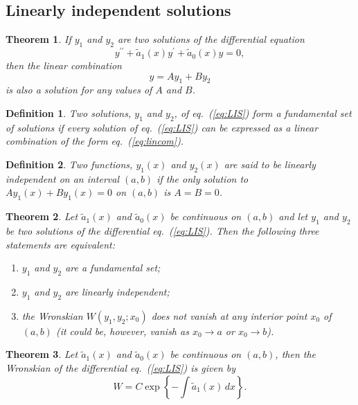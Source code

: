 \documentclass{article}
\newtheorem{theorem}{Theorem}
\newtheorem{definition}{Definition}
\begin{document}
\subsection{Linearly independent solutions}
\begin{theorem}
    If $y_1$ and $y_2$ are two solutions of the differential equation
    \begin{equation}
        y^{\prime\prime}+\tilde{a}_1(x)y^\prime + \tilde{a}_0(x)y = 0, \label{eq:LIS}
    \end{equation}
    then the linear combination
    \begin{equation}
        y = Ay_1 + By_2 \label{eq:lincom}
    \end{equation}
    is also a solution for any values of $A$ and $B$.
\end{theorem}
\begin{definition}
    Two solutions, $y_1$ and $y_2$, of eq.~(\ref{eq:LIS}) form a fundamental set of solutions if every solution of eq.~(\ref{eq:LIS}) can be expressed as a linear combination of the form eq.~(\ref{eq:lincom}). 
\end{definition}
\begin{definition}
    Two functions, $y_1(x)$ and $y_2(x)$ are said to be linearly independent on an interval $(a,b)$ if the only solution to $Ay_1(x)+By_1(x) = 0$ on $(a,b)$ is $A=B=0$. 
\end{definition}
\begin{theorem}
    Let $\tilde{a}_1(x)$ and $\tilde{a}_0(x)$ be continuous on $(a,b)$ and let $y_1$ and $y_2$ be two solutions of the differential eq.~(\ref{eq:LIS}). Then the following three statements are equivalent:
    \begin{enumerate}
        \item $y_1$ and $y_2$ are a fundamental set;
        \item $y_1$ and $y_2$ are linearly independent;
        \item the Wronskian $W(y_1,y_2;x_0)$ does not vanish at any interior point $x_0$ of $(a,b)$ (it could be, however, vanish as $x_0\to a$ or $x_0\to b$).
    \end{enumerate}
\end{theorem}
\begin{theorem}
    Let $\tilde{a}_1(x)$ and $\tilde{a}_0(x)$ be continuous on $(a,b)$, then the Wronskian of the differential eq.~(\ref{eq:LIS}) is given by
    \begin{equation}
        W=C\exp \left\{ -\int\tilde{a}_1(x)\, dx \right\}.
    \end{equation}
\end{theorem}
\end{document}
